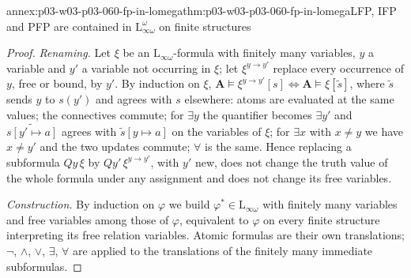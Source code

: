\begin{annexitem}{annex:p03-w03-p03-060-fp-in-lomega}{thm:p03-w03-p03-060-fp-in-lomega}{LFP, IFP and PFP are contained in \(\mathrm{L}^\omega_{\infty\omega}\) on finite structures}
\begin{proof}
\emph{Renaming.} Let \(\xi\) be an \(\mathrm{L}_{\infty\omega}\)-formula
with finitely many variables, \(y\) a variable and \(y'\) a variable not
occurring in \(\xi\); let \(\xi^{y\to y'}\) replace every occurrence of
\(y\), free or bound, by \(y'\). By induction on \(\xi\),
\(\mathbf A\models\xi^{y\to y'}[s]\iff\mathbf A\models\xi[\tilde s]\),
where \(\tilde s\) sends \(y\) to \(s(y')\) and agrees with \(s\)
elsewhere: atoms are evaluated at the same values; the connectives commute;
for \(\exists y\) the quantifier becomes \(\exists y'\) and
\(\widetilde{s[y'\mapsto a]}\) agrees with \(\tilde s[y\mapsto a]\) on the
variables of \(\xi\); for \(\exists x\) with \(x\neq y\) we have
\(x\neq y'\) and the two updates commute; \(\forall\) is the same. Hence
replacing a subformula \(Qy\,\xi\) by \(Qy'\,\xi^{y\to y'}\), with \(y'\)
new, does not change the truth value of the whole formula under any
assignment and does not change its free variables.

\emph{Construction.} By induction on \(\varphi\) we build
\(\varphi^\ast\in\mathrm{L}_{\infty\omega}\) with finitely many variables
and free variables among those of \(\varphi\), equivalent to \(\varphi\) on
every finite structure interpreting its free relation variables. Atomic
formulas are their own translations; \(\neg\), \(\wedge\), \(\vee\),
\(\exists\), \(\forall\) are applied to the translations of the finitely
many immediate subformulas.


\end{proof}
\end{annexitem}
